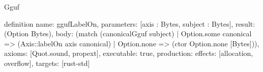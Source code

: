 \begin{lexlean}{Gguf}
\begin{semanticmodule}
definition{
  name: ggufLabelOn,
  parameters: [axis : Bytes, subject : Bytes],
  result: (Option Bytes),
  body: (match (canonicalGguf subject)
    | Option.some canonical => (Axis::labelOn axis canonical)
    | Option.none => (ctor Option.none [Bytes])),
  axioms: [Quot.sound, propext],
  executable: true,
  production: {effects: [allocation, overflow], targets: [rust-std]}
}
\end{semanticmodule}
\end{lexlean}
